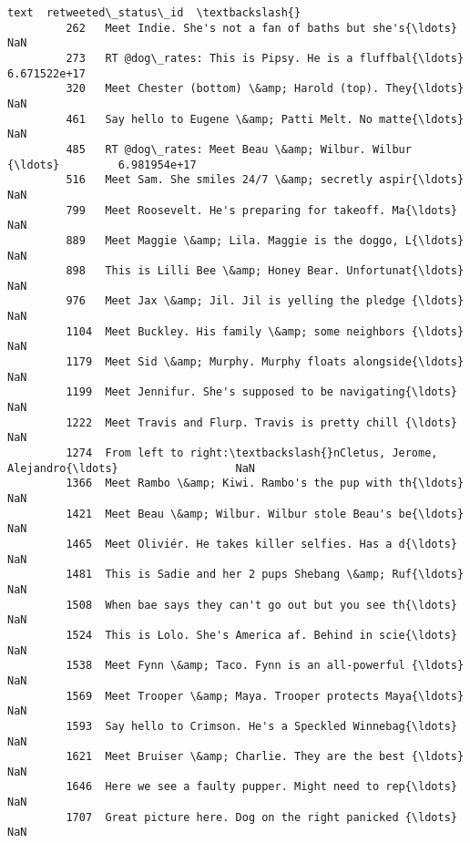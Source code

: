 \documentclass[11pt]{article}
\begin{document}
\begin{Verbatim}[commandchars=\\\{\}]
                                                            text  retweeted\_status\_id  \textbackslash{}
         262   Meet Indie. She's not a fan of baths but she's{\ldots}                  NaN   
         273   RT @dog\_rates: This is Pipsy. He is a fluffbal{\ldots}         6.671522e+17   
         320   Meet Chester (bottom) \&amp; Harold (top). They{\ldots}                  NaN   
         461   Say hello to Eugene \&amp; Patti Melt. No matte{\ldots}                  NaN   
         485   RT @dog\_rates: Meet Beau \&amp; Wilbur. Wilbur {\ldots}         6.981954e+17   
         516   Meet Sam. She smiles 24/7 \&amp; secretly aspir{\ldots}                  NaN   
         799   Meet Roosevelt. He's preparing for takeoff. Ma{\ldots}                  NaN   
         889   Meet Maggie \&amp; Lila. Maggie is the doggo, L{\ldots}                  NaN   
         898   This is Lilli Bee \&amp; Honey Bear. Unfortunat{\ldots}                  NaN   
         976   Meet Jax \&amp; Jil. Jil is yelling the pledge {\ldots}                  NaN   
         1104  Meet Buckley. His family \&amp; some neighbors {\ldots}                  NaN   
         1179  Meet Sid \&amp; Murphy. Murphy floats alongside{\ldots}                  NaN   
         1199  Meet Jennifur. She's supposed to be navigating{\ldots}                  NaN   
         1222  Meet Travis and Flurp. Travis is pretty chill {\ldots}                  NaN   
         1274  From left to right:\textbackslash{}nCletus, Jerome, Alejandro{\ldots}                  NaN   
         1366  Meet Rambo \&amp; Kiwi. Rambo's the pup with th{\ldots}                  NaN   
         1421  Meet Beau \&amp; Wilbur. Wilbur stole Beau's be{\ldots}                  NaN   
         1465  Meet Oliviér. He takes killer selfies. Has a d{\ldots}                  NaN   
         1481  This is Sadie and her 2 pups Shebang \&amp; Ruf{\ldots}                  NaN   
         1508  When bae says they can't go out but you see th{\ldots}                  NaN   
         1524  This is Lolo. She's America af. Behind in scie{\ldots}                  NaN   
         1538  Meet Fynn \&amp; Taco. Fynn is an all-powerful {\ldots}                  NaN   
         1569  Meet Trooper \&amp; Maya. Trooper protects Maya{\ldots}                  NaN   
         1593  Say hello to Crimson. He's a Speckled Winnebag{\ldots}                  NaN   
         1621  Meet Bruiser \&amp; Charlie. They are the best {\ldots}                  NaN   
         1646  Here we see a faulty pupper. Might need to rep{\ldots}                  NaN   
         1707  Great picture here. Dog on the right panicked {\ldots}                  NaN   

\end{Verbatim}
\end{document}
